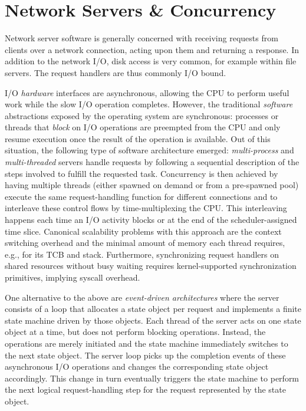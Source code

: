 \documentclass[12pt,a4paper]{book}
\begin{document}
\section{Network Servers \& Concurrency}\label{ch:relwork:concmod}
Network server software is generally concerned with receiving requests from clients over a network connection, acting upon them and returning a response.
In addition to the network I/O, disk access is very common, for example within file servers.
The request handlers are thus commonly I/O bound.~\cite{seda}

I/O \emph{hardware} interfaces are asynchronous, allowing the CPU to perform useful work while the slow I/O operation completes.
However, the traditional \emph{software} abstractions exposed by the operating system are synchronous:
processes or threads that \emph{block} on I/O operations are preempted from the CPU and only resume execution once the result of the operation is available.
Out of this situation, the following type of software architecture emerged:
\emph{multi-process} and \emph{multi-threaded} servers handle requests by following a sequential description of the steps involved to fulfill the requested task.
Concurrency is then achieved by having multiple threads (either spawned on demand or from a pre-spawned pool) execute the same request-handling function for different connections and to interleave these control flows by time-multiplexing the CPU.
This interleaving happens each time an I/O activity blocks or at the end of the scheduler-assigned time slice.
Canonical scalability problems with this approach are the context switching overhead and the minimal amount of memory each thread requires, e.g., for its TCB and stack.
Furthermore, synchronizing request handlers on shared resources without busy waiting requires kernel-supported synchronization primitives, implying syscall overhead.~\cite{flashwebsrv,c10k,andersonThreads,seda}

One alternative to the above are \emph{event-driven architectures} where the server consists of a loop that allocates a state object per request and implements a finite state machine driven by those objects.
Each thread of the server acts on one state object at a time, but does not perform blocking operations.
Instead, the operations are merely initiated and the state machine immediately switches to the next state object.
The server loop picks up the completion events of these asynchronous I/O operations and changes the corresponding state object accordingly.
This change in turn eventually triggers the state machine to perform the next logical request-handling step for the request represented by the state object.~\cite{flashwebsrv,seda,c10k}
\end{document}
